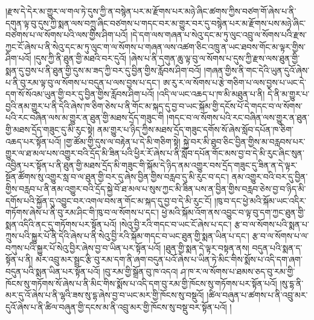 །རྫས་དེ་དེར་མ་གྱུར་ལ་གལ་ཏེ་དུས་ཀྱི་ན་བསྙེན་པར་མ་རྫོགས་པར་མཉེ་ཞིང་ཚགས་ཀྱིས་བཙག་གོ་ཞེས་པ་ནི་དགུན་ལྟ་བུ་དུས་ཀྱི་སྨན་ལས་བཀྲུ་ཞིང་བཙགས་པ་གདང་བར་མ་གྱུར་བར་དུ་བསྙེན་པར་མ་རྫོགས་པས་མཉེ་ཞིང་བཙགས་པ་ལ་སོགས་པའི་ལས་གྱིས་ཤིག་པའོ། །དེ་དག་ལས་གཞན་པ་སེའུ་དང་མ་ཏུ་ལུང་འབྲུ་ལ་སོགས་པའི་རྫས་ཀྱང་ངོ་ཞེས་པ་ནི་སེའུ་དང་མ་ཏུ་ལུང་ག་ལ་སོགས་པ་གཞན་ལས་འཚག་ཅིང་འཁྲུ་ན་ཡང་ཐབས་གོང་མ་ལྟར་གྱིས་ཤིག་པའོ། །དུས་ཀྱི་ནི་ཐུན་གྱི་མཐའི་བར་དུའོ། །ཞེས་པ་ནི་དགུན་ཆུ་ལྟ་བུ་ལ་སོགས་པ་དུས་ཀྱི་རྫས་ལས་ཐུན་གྱི་སྨན་དུ་བྱས་པ་ནི་ཐུན་གྱི་དུས་མ་ཟད་ཀྱི་བར་དུ་བྱིན་གྱིས་རློབས་ཤིག་བའོ། །གཞན་གྱིས་ནི་གང་དེའི་ཡུན་དུའོ་ཞེས་པ་ནི་བུ་རམ་ལྟ་བུ་ལ་སོགས་པ་བདུན་པ་ལས་བྱས་པ་དང་།  ཨ་རུ་ར་ལ་སོགས་པ་རྩེ་གཅིག་པ་ལས་བྱས་པ་ཡང་དེ་དག་སོ་སོའམ་ཡུན་གྱི་བར་དུ་བྱིན་གྱིས་རློབས་ཤིག་པའོ། །འདི་ལ་ཡང་འཆད་པ་ཁ་མི་མཐུན་པ་ནི། དེ་ནི་མ་གྱུར་པ་བྱའི་ནམ་གྱུར་པ་ནི་དེའི་ཞེས་ཁ་ཅིག་ཅེས་པ་ནི་གོང་མ་སྐད་དུ་བྱ་བ་ཡང་སྐོམ་གྱི་དངོས་པོ་དེ་གདང་བ་ལ་སོགས་པའི་རང་བཞིན་ལས་མ་གྱུར་ན་ཐུན་གྱི་མཐས་དྲོད་གཟུང་གི །གདང་བ་ལ་སོགས་པའི་རང་བཞིན་ལས་གྱུར་ན་ཐུན་གྱི་མཐས་དྲོད་གཟུང་དུ་མི་རུང་སྟེ། ནམ་གྱུར་པ་ཉིད་ཀྱིས་མཐས་དྲོད་གཟུང་དགོས་སོ་ཞེས་སློབ་དཔོན་ཁ་ཅིག་འཆད་པར་སྟོན་པའོ། །གྱ་ཚོམ་གྱི་དུས་ལ་བརྟེན་པ་དེ་མི་གཅིག་སྟེ། སྐྱེ་བར་མི་ཐུབ་ཅིང་བྱིན་གྱིས་མ་བརླབས་པར་གྱུར་ལ་ཐ་མལ་པས་འགྱུར་བའི་དྲོད་མི་ཟིན་པའི་ཕྱིར་རོ་ཞེས་པ་ནི་སློབ་དཔོན་གོང་མས་བྱ་བ་དེ་མི་རུང་ཞིང་སུན་འབྱིན་པར་སྟོན་པ་ནི་ཐུན་གྱི་མཐས་དྲོད་མི་གཟུང་གི་སྐོམ་དེ་ཉིད་ནམ་འགྱུར་བས་དྲོད་གཟུང་དུ་ཟིན་ན་དེ་ལྟར་སྔོན་ཚོགས་སུ་འགྱུར་སླ་བ་ལ་ཐུན་གྱི་བར་དུ་ཞེས་བྱིན་གྱིས་བརླབ་དུ་མི་རུང་བ་དང་། ནམ་འགྱུར་བའི་བར་དུ་བྱིན་གྱིས་བརླབ་པ་ནི་ནམ་འགྱུར་བའི་དྲོད་སྐྱེ་བོ་ཐ་མལ་པ་སུས་ཀྱང་མི་ཟིན་པས་ན་བྱིན་གྱིས་བརླབ་ཅེས་བྱ་བ་ཉིད་མི་དགོས་པའི་སྐྱོན་དུ་འབྱུང་བར་འགལ་བས་ན་གོང་མ་སྐད་དུ་བྱ་བ་དེ་མི་རུང་ངོ། །ཁུ་བ་དང་ཕྱེ་མའི་སྐོམ་ཡང་འདིར་གཏོགས་ཞེས་པ་ནི་བུ་རམ་ཤིང་གི་ཁུ་བ་ལ་སོགས་པ་དང་། ཕྱེ་མའི་སྐོམ་འོག་ནས་འབྱུང་བ་ལྟ་བུ་དག་ཀྱང་ཐུན་གྱི་སྨན་འདིའི་ནང་དུ་གཏོགས་པར་སྟོན་པའོ། །སེའུ་བྱི་རའི་གདང་བ་ཡང་ངོ་ཞེས་པ་དང་། རྩ་བ་ལ་སོགས་པའི་སྨན་པ་ཀྲུས་པའི་སྐྱུར་པོ་ནི་དེའི་ཞེས་པ་ནི་སེའུ་བྱི་རའི་སྐོམ་གདང་བ་ཡང་ཐུན་གྱི་སྨན་ཡིན་པ་དང་། རྩ་བ་ལ་སོགས་པ་ལ་བཀུས་པའི་སྐྱུར་པོ་སེའུ་བྱིར་ཞེས་བྱ་བ་ཡིན་པར་སྟོན་པའོ། །ཐུན་གྱི་སྨན་དེ་ལྟར་བསྟན་ནས། བདུན་པའི་སྨན་ད་སྟོན་པ་ནི། མར་འབྲུ་མར་སྦྲང་རྩི་བུ་རམ་དག་ནི་ཞག་བདུན་པའོ་ཞེས་པ་ཡིན་ཏེ་མིང་གིས་སྨོས་པ་འདི་དག་ཞག་བདུན་པའི་སྨན་ཡིན་པར་སྟོན་པའོ། །བུ་རམ་གྱི་སྒྲོན་བུ་ཁ་འདའ། ཤ་ཁ་ར་ལ་སོགས་པ་ཐམས་ཅད་བུ་རམ་གྱི་ཁོངས་སུ་གཏོགས་སོ་ཞེས་པ་ནི་མིང་གིས་སྨོས་པ་འདི་དག་བུ་རམ་གྱི་ཁོངས་སུ་གཏོགས་པར་སྟོན་པའོ། །སུ་དྷ་ནི་མར་དུ་འོ་ཞེས་པ་ནི་ལྷའི་ཟས་སུ་དྷ་ཞེས་བྱ་བ་ཡང་མར་གྱི་ཁོངས་སུ་བསྡུའོ། །ཚིལ་བཞུན་པ་ཚགས་པ་ནི་འབྲུ་མར་དུའོ་ཞེས་པ་ནི་ཚིལ་བཞུན་གྱི་དངས་མ་ནི་འབྲུ་མར་གྱི་ཁོངས་སུ་བསྡུ་བར་སྟོན་པའོ། །
